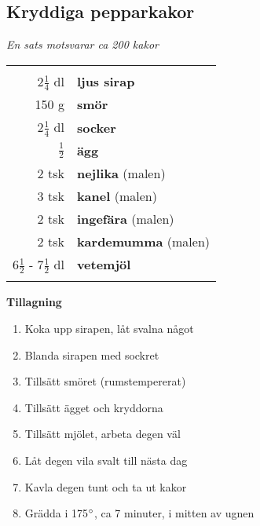 \documentclass[a4paper,12pt]{article}
\newcommand{\sats}[1]{\noindent \textit{En sats motsvarar #1}}
\begin{document}
\clearpage

\subsection{Kryddiga pepparkakor}
\sats{ca 200 kakor}

\begin{table}[H]
	\begin{tabular}{rl}
	\hline
	&\\
		2$\frac{1}{4}$ dl & \textbf{ljus sirap} \\
		150 g & \textbf{smör} \\
		2$\frac{1}{4}$ dl & \textbf{socker} \\
		$\frac{1}{2}$ & \textbf{ägg} \\
		2 tsk & \textbf{nejlika} (malen) \\
		3 tsk & \textbf{kanel} (malen) \\
		2 tsk & \textbf{ingefära} (malen) \\
		2 tsk & \textbf{kardemumma} (malen) \\
		6$\frac{1}{2}$ - 7$\frac{1}{2}$ dl & \textbf{vetemjöl} \\
	&\\
	\hline
	\end{tabular}
\end{table}

\begin{multicols*}{2}

\noindent \textbf{Tillagning}
\begin{enumerate}
	\itemsep0cm
	\item Koka upp sirapen, låt svalna något
	\item Blanda sirapen med sockret
	\item Tillsätt smöret (rumstempererat)
	\item Tillsätt ägget och kryddorna
	\item Tillsätt mjölet, arbeta degen väl
	\item Låt degen vila svalt till nästa dag
	\item Kavla degen tunt och ta ut kakor
	\item Grädda i 175$\degree$, ca 7 minuter, i mitten av ugnen
\end{enumerate}

\end{multicols*}

\clearpage

\end{document}
